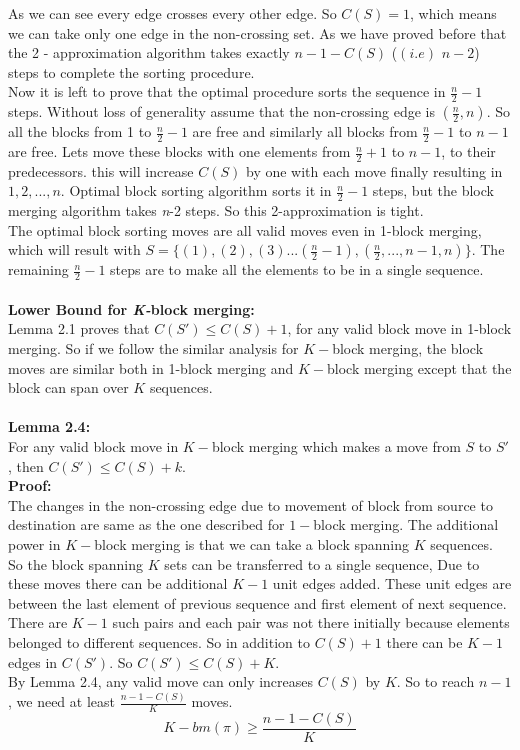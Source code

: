 \documentclass[BTech]{iitmdiss}
\begin{document}
\noindent
As we can see every edge crosses every other edge. So $C(S) = 1$, which means we can take only one edge in the non-crossing set. As we have proved before that the 2 - approximation algorithm takes exactly $n-1-C(S)$ ($(i.e)$ $n-2$) steps to complete the sorting procedure.\\
Now it is left to prove that the optimal procedure sorts the sequence in $\frac{n}{2} - 1$ steps. Without loss of generality assume that the non-crossing edge is $(\frac{n}{2},n)$. So all the blocks from 1 to $\frac{n}{2} - 1$ are free and similarly all blocks from $\frac{n}{2} - 1$ to $n-1$ are free. Lets move these blocks with one elements from $\frac{n}{2} + 1$ to $n-1$, to their predecessors. this will increase $C(S)$ by one with each move finally resulting in $1,2,...,n$. Optimal block sorting algorithm sorts it in  $\frac{n}{2} - 1$ steps, but the block merging algorithm takes \textit{n}-2 steps. So this 2-approximation is tight.\\
The optimal block sorting moves are all valid moves even in 1-block merging, which will result with $S = \{(1),(2),(3)...(\frac{n}{2}-1),(\frac{n}{2},...,n-1,n)\}$. The remaining $\frac{n}{2} - 1$ steps are to make all the elements to be in a single sequence.\\~\\
\textbf{Lower Bound for \textit{K-}block merging:}\\
Lemma 2.1 proves that $C(S') \leq C(S) + 1$, for any valid block move in 1-block merging. So if we follow the similar analysis for $K-$block merging, the block moves are similar both in 1-block merging and $K-$block merging except that the block can span over $K$ sequences.\\~\\
\textbf{Lemma 2.4:}\\
For any valid block move in $K-$block merging which makes a move from $S$ to $S'$, then $C(S') \leq C(S) + k.$\\
\textbf{Proof:}\\
The changes in the non-crossing edge due to movement of block from source to destination are same as the one described for $1-$block merging. The additional power in $K-$block merging is that we can take a block spanning $K$ sequences. So the block spanning $K$ sets can be transferred to a single sequence, Due to these moves there can be additional $K-1$ unit edges added. These unit edges are between the last element of previous sequence and first element of next sequence. There are $K-1$ such pairs and each pair was not there initially because elements belonged to different sequences. So in addition to $C(S) + 1$ there can be $K-1$ edges in $C(S')$. So $C(S') \leq C(S) + K$. 
\\
By Lemma 2.4, any valid move can only increases $C(S)$ by $K$. So to reach $n-1$, we need at least $\frac{n-1-C(S)}{K}$ moves.
$$K-bm(\pi) \geq \frac{n-1-C(S)}{K}$$
\end{document}
